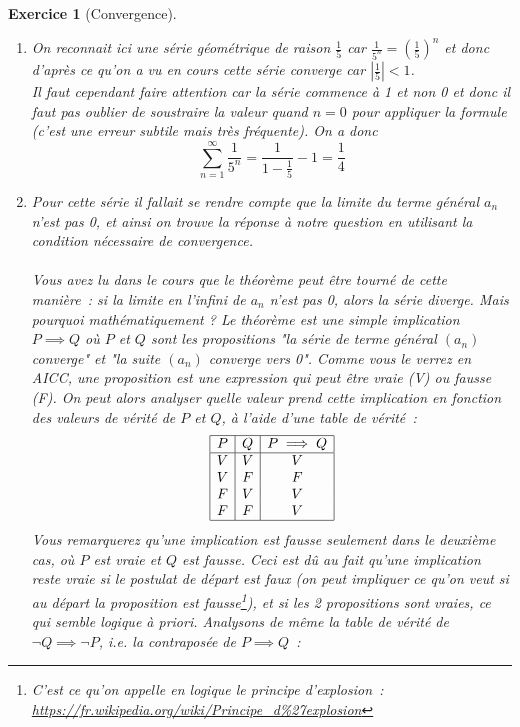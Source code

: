 \documentclass[11.5pt,french,table]{article}
\newcommand{\enumeratelinefix}{\leavevmode \vspace{-\baselineskip}} %
\theoremstyle{exercice}
\newtheorem{exercice}{Exercice}
\begin{document}
\begin{exercice}[Convergence]
\enumeratelinefix
\begin{enumerate}
    \item On reconnait ici une série géométrique de raison $\frac{1}{5}$ car $\frac{1}{5^n} = (\frac{1}{5})^n$ et donc d'après ce qu'on a vu en cours cette série converge car $\left|\frac{1}{5}\right| < 1$.
    \\
    Il faut cependant faire attention car la série commence à 1 et non 0 et donc il faut pas oublier de soustraire la valeur quand $n=0$ pour appliquer la formule (c'est une erreur subtile mais très fréquente). On a donc
    \[
    \sum_{n=1}^\infty \frac{1}{5^n} = \frac{1}{1 - \frac{1}{5}} - 1 = \frac{1}{4}
    \]
    
    \item Pour cette série il fallait se rendre compte que la limite du terme général $a_n$ n'est pas 0, et ainsi on trouve la réponse à notre question en utilisant la condition nécessaire de convergence.
    \\
    \\
    Vous avez lu dans le cours que le théorème peut être tourné de cette manière~: si la limite en l'infini de $a_n$ n'est pas 0, alors la série diverge. Mais pourquoi mathématiquement ? Le théorème est une simple implication $P \implies Q$ où $P$ et $Q$ sont les propositions "la série de terme général $(a_n)$ converge" et "la suite $(a_n)$ converge vers 0". Comme vous le verrez en AICC, une proposition est une expression qui peut être \emph{vraie} (V) ou \emph{fausse} (F). On peut alors analyser quelle valeur prend cette implication en fonction des valeurs de vérité de $P$ et $Q$, à l'aide d'une \emph{table de vérité}~:
    \[
    \begin{array}{|c|c|c|} \hline %
    P & Q & P \implies Q\\ \hline
    V & V & V\\
    V & F & F\\
    F & V & V\\
    F & F & V\\
    \hline
    \end{array} %
    \]
    Vous remarquerez qu'une implication est fausse seulement dans le deuxième cas, où $P$ est vraie et $Q$ est fausse. Ceci est dû au fait qu'une implication reste vraie si le postulat de départ est faux (on peut impliquer ce qu'on veut si au départ la proposition est fausse\footnote{C'est ce qu'on appelle en logique le \emph{principe d'explosion}~: \url{https://fr.wikipedia.org/wiki/Principe_d\%27explosion}}), et si les 2 propositions sont vraies, ce qui semble logique à priori. Analysons de même la table de vérité de $\neg Q \implies \neg P$, i.e. la \emph{contraposée} de $P \implies Q$~:
    

\end{enumerate}
\end{exercice}
\end{document}
